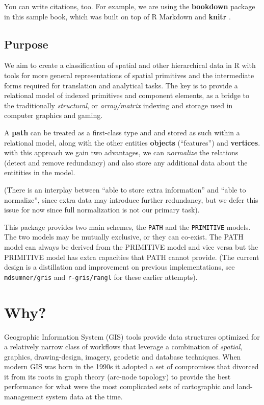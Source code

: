 \documentclass[]{book}
\theoremstyle{definition}
\theoremstyle{definition}
\theoremstyle{definition}
\theoremstyle{remark}
\begin{document}
You can write citations, too. For example, we are using the
\textbf{bookdown} package \citep{R-bookdown} in this sample book, which
was built on top of R Markdown and \textbf{knitr} \citep{xie2015}.

\section{Purpose}\label{purpose}

We aim to create a classification of spatial and other hierarchical data
in R with tools for more general representations of spatial primitives
and the intermediate forms required for translation and analytical
tasks. The key is to provide a relational model of indexed primitives
and component elements, as a bridge to the traditionally
\emph{structural}, or \emph{array/matrix} indexing and storage used in
computer graphics and gaming.

A \textbf{path} can be treated as a first-class type and and stored as
such within a relational model, along with the other entities
\textbf{objects} (``features'') and \textbf{vertices}. with this
approach we gain two advantages, we can \emph{normalize} the relations
(detect and remove redundancy) and also store any additional data about
the entitities in the model.

(There is an interplay between ``able to store extra information'' and
``able to normalize'', since extra data may introduce further
redundancy, but we defer this issue for now since full normalization is
not our primary task).

This package provides two main schemes, the \texttt{PATH} and the
\texttt{PRIMITIVE} models. The two models may be mutually exclusive, or
they can co-exist. The PATH model can always be derived from the
PRIMITIVE model and vice versa but the PRIMITIVE model has extra
capacities that PATH cannot provide. (The current design is a
distillation and improvement on previous implementations, see
\texttt{mdsumner/gris} and \texttt{r-gris/rangl} for these earlier
attempts).

\chapter{Why?}\label{why}

Geographic Information System (GIS) tools provide data structures
optimized for a relatively narrow class of workflows that leverage a
combination of \emph{spatial}, graphics, drawing-design, imagery,
geodetic and database techniques. When modern GIS was born in the 1990s
it adopted a set of compromises that divorced it from its roots in graph
theory (arc-node topology) to provide the best performance for what were
the most complicated sets of cartographic and land-management system
data at the time.
\end{document}
